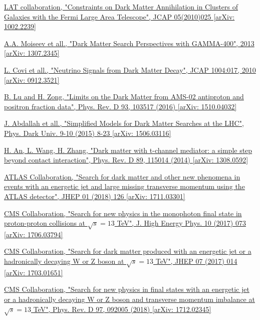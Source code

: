 \documentclass[a4paper, 10pt, openright]{report}
\begin{document}
\begin{thebibliography}{1}
\href{https://arxiv.org/pdf/1106.3416.pdf}{LAT collaboration,
"Constraints on Dark Matter Annihilation in Clusters of Galaxies with the Fermi Large Area Telescope",
JCAP 05(2010)025 [arXiv: 1002.2239]
}

\href{https://arxiv.org/abs/1307.2345}{A.A. Moiseev et all.,
"Dark Matter Search Perspectives with GAMMA-400",
2013 [arXiv: 1307.2345]
}

\href{https://arxiv.org/abs/0912.3521}{L. Covi et all.,
"Neutrino Signals from Dark Matter Decay",
JCAP 1004:017, 2010 [arXiv: 0912.3521]
}

\href{https://arxiv.org/abs/1510.04032}{B. Lu and H. Zong,
"Limits on the Dark Matter from AMS-02 antiproton and positron fraction data",
Phys. Rev. D 93, 103517 (2016) [arXiv: 1510.04032]
}

\href{https://arxiv.org/abs/1506.03116}{J. Abdallah et all.,
"Simplified Models for Dark Matter Searches at the LHC",
Phys. Dark Univ. 9-10 (2015) 8-23 [arXiv: 1506.03116]
}

\href{https://arxiv.org/abs/1308.0592}{H. An, L. Wang, H. Zhang,
"Dark matter with t-channel mediator: a simple step beyond contact interaction",
Phys. Rev. D 89, 115014 (2014) [arXiv: 1308.0592]
}

\href{https://arxiv.org/abs/1711.03301}{ATLAS Collaboration,
"Search for dark matter and other new phenomena in events with an energetic jet and large missing transverse momentum using the ATLAS detector",
JHEP 01 (2018) 126 [arXiv: 1711.03301]
}

\href{https://arxiv.org/abs/1706.03794}{CMS Collaboration,
"Search for new physics in the monophoton final state in proton-proton collisions at $\sqrt{s} = 13$ TeV",
J. High Energy Phys. 10 (2017) 073 [arXiv: 1706.03794]
}

\href{https://arxiv.org/abs/1703.01651}{CMS Collaboration,
"Search for dark matter produced with an energetic jet or a hadronically decaying W or Z boson at $\sqrt{s} = 13$ TeV",
JHEP 07 (2017) 014 [arXiv: 1703.01651]
}

\href{https://arxiv.org/abs/1712.02345}{CMS Collaboration,
"Search for new physics in final states with an energetic jet or a hadronically decaying W or Z boson and transverse momentum imbalance at $\sqrt{s} = 13$ TeV",
Phys. Rev. D 97, 092005 (2018) [arXiv: 1712.02345]
}


\end{thebibliography}
\end{document}
